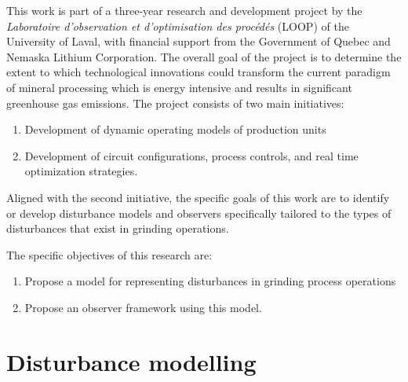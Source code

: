 This work is part of a three-year research and development project by the \textit{Laboratoire d’observation et d’optimisation des procédés} (LOOP) of the University of Laval, with financial support from the Government of Quebec and Nemaska Lithium Corporation. The overall goal of the project is to determine the extent to which technological innovations could transform the current paradigm of mineral processing which is energy intensive and results in significant greenhouse gas emissions. The project consists of two main initiatives:

\begin{enumerate}
	\item Development of dynamic operating models of production units
	\item Development of circuit configurations, process controls, and real time optimization strategies.
\end{enumerate}

Aligned with the second initiative, the specific goals of this work are to identify or develop disturbance models and observers specifically tailored to the types of disturbances that exist in grinding operations.

The specific objectives of this research are:

\begin{enumerate}
	\item Propose a model for representing disturbances in grinding process operations
	\item Propose an observer framework using this model.
\end{enumerate}


\section*{Disturbance modelling}

